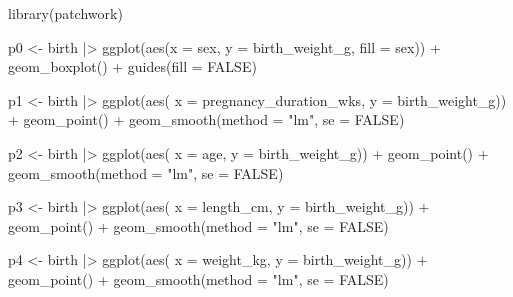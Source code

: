 \documentclass[
  letterpaper,
  DIV=11,
  numbers=noendperiod]{scrreprt}
\newenvironment{Shaded}{\begin{snugshade}}{\end{snugshade}}
\newcommand{\AttributeTok}[1]{\textcolor[rgb]{0.40,0.45,0.13}{#1}}
\newcommand{\ConstantTok}[1]{\textcolor[rgb]{0.56,0.35,0.01}{#1}}
\newcommand{\FunctionTok}[1]{\textcolor[rgb]{0.28,0.35,0.67}{#1}}
\newcommand{\NormalTok}[1]{\textcolor[rgb]{0.00,0.23,0.31}{#1}}
\newcommand{\OtherTok}[1]{\textcolor[rgb]{0.00,0.23,0.31}{#1}}
\newcommand{\SpecialCharTok}[1]{\textcolor[rgb]{0.37,0.37,0.37}{#1}}
\newcommand{\StringTok}[1]{\textcolor[rgb]{0.13,0.47,0.30}{#1}}
\begin{document}
\begin{Shaded}
\begin{Highlighting}[]
\FunctionTok{library}\NormalTok{(patchwork)}

\NormalTok{p0 }\OtherTok{\textless{}{-}}\NormalTok{ birth }\SpecialCharTok{|\textgreater{}} 
  \FunctionTok{ggplot}\NormalTok{(}\FunctionTok{aes}\NormalTok{(}\AttributeTok{x =}\NormalTok{ sex, }\AttributeTok{y =}\NormalTok{ birth\_weight\_g, }\AttributeTok{fill =}\NormalTok{ sex)) }\SpecialCharTok{+} 
  \FunctionTok{geom\_boxplot}\NormalTok{() }\SpecialCharTok{+}
  \FunctionTok{guides}\NormalTok{(}\AttributeTok{fill =} \ConstantTok{FALSE}\NormalTok{)}

\NormalTok{p1 }\OtherTok{\textless{}{-}}\NormalTok{ birth }\SpecialCharTok{|\textgreater{}} 
  \FunctionTok{ggplot}\NormalTok{(}\FunctionTok{aes}\NormalTok{(}
    \AttributeTok{x =}\NormalTok{ pregnancy\_duration\_wks, }
    \AttributeTok{y =}\NormalTok{ birth\_weight\_g)) }\SpecialCharTok{+} 
  \FunctionTok{geom\_point}\NormalTok{() }\SpecialCharTok{+} 
  \FunctionTok{geom\_smooth}\NormalTok{(}\AttributeTok{method =} \StringTok{"lm"}\NormalTok{, }\AttributeTok{se =} \ConstantTok{FALSE}\NormalTok{) }

\NormalTok{p2 }\OtherTok{\textless{}{-}}\NormalTok{ birth }\SpecialCharTok{|\textgreater{}} 
  \FunctionTok{ggplot}\NormalTok{(}\FunctionTok{aes}\NormalTok{(}
    \AttributeTok{x =}\NormalTok{ age, }
    \AttributeTok{y =}\NormalTok{ birth\_weight\_g)) }\SpecialCharTok{+} 
  \FunctionTok{geom\_point}\NormalTok{() }\SpecialCharTok{+} 
  \FunctionTok{geom\_smooth}\NormalTok{(}\AttributeTok{method =} \StringTok{"lm"}\NormalTok{, }\AttributeTok{se =} \ConstantTok{FALSE}\NormalTok{)}

\NormalTok{p3 }\OtherTok{\textless{}{-}}\NormalTok{ birth }\SpecialCharTok{|\textgreater{}} 
  \FunctionTok{ggplot}\NormalTok{(}\FunctionTok{aes}\NormalTok{(}
    \AttributeTok{x =}\NormalTok{ length\_cm, }
    \AttributeTok{y =}\NormalTok{ birth\_weight\_g)) }\SpecialCharTok{+} 
  \FunctionTok{geom\_point}\NormalTok{() }\SpecialCharTok{+} 
  \FunctionTok{geom\_smooth}\NormalTok{(}\AttributeTok{method =} \StringTok{"lm"}\NormalTok{, }\AttributeTok{se =} \ConstantTok{FALSE}\NormalTok{)}

\NormalTok{p4 }\OtherTok{\textless{}{-}}\NormalTok{ birth }\SpecialCharTok{|\textgreater{}} 
  \FunctionTok{ggplot}\NormalTok{(}\FunctionTok{aes}\NormalTok{(}
    \AttributeTok{x =}\NormalTok{ weight\_kg, }
    \AttributeTok{y =}\NormalTok{ birth\_weight\_g)) }\SpecialCharTok{+} 
  \FunctionTok{geom\_point}\NormalTok{() }\SpecialCharTok{+} 
  \FunctionTok{geom\_smooth}\NormalTok{(}\AttributeTok{method =} \StringTok{"lm"}\NormalTok{, }\AttributeTok{se =} \ConstantTok{FALSE}\NormalTok{)}


\end{Highlighting}
\end{Shaded}
\end{document}
